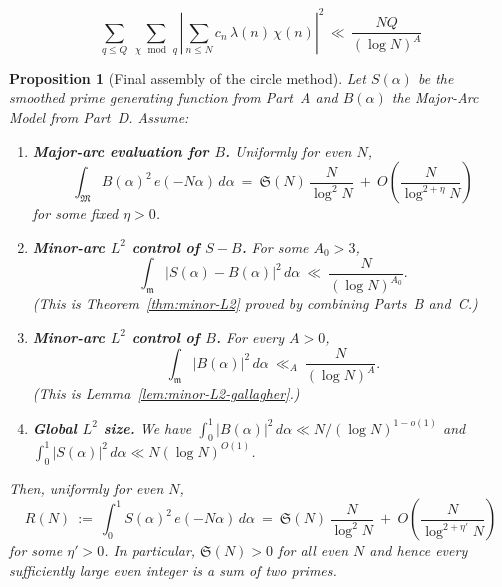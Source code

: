 \documentclass[11pt]{article}
\newtheorem{proposition}[lemma]{Proposition}
\theoremstyle{definition}
\theoremstyle{remark}
\numberwithin{equation}{part}
\begin{document}
\begin{equation}\label{eq:char-second-moment}\sum_{q\le Q}\ \sum_{\chi\,\bmod\, q}\left|\sum_{n\le N} c_n\,\lambda(n)\,\chi(n)\right|^{2}\,\ll\, \frac{NQ}{(\log N)^A}\end{equation}
\begin{proposition}[Final assembly of the circle method]
	\label{prop:reduction}
	Let $S(\alpha)$ be the smoothed prime generating function from Part~A and $B(\alpha)$ the Major-Arc Model from Part~D. Assume:

	\begin{enumerate}[label=(H\arabic*)]
		\item\label{H1} \textbf{Major-arc evaluation for $B$.} Uniformly for even $N$,
		      \[
			      \int_{\mathfrak M} B(\alpha)^2\,e(-N\alpha)\,d\alpha
			      \ =\ \mathfrak S(N)\,\frac{N}{\log^2 N}\ +\ O\!\left(\frac{N}{\log^{2+\eta}N}\right)
		      \]
		      for some fixed $\eta>0$.
		\item\label{H2} \textbf{Minor-arc $L^2$ control of $S-B$.}
		      For some $A_0>3$,
		      \[
			      \int_{\mathfrak m}\!|S(\alpha)-B(\alpha)|^2\,d\alpha\ \ll\ \frac{N}{(\log N)^{A_0}}.
		      \]
		      (This is Theorem~\ref{thm:minor-L2} proved by combining Parts~B and~C.)
		\item\label{H3} \textbf{Minor-arc $L^2$ control of $B$.} For every $A>0$,
		      \[
			      \int_{\mathfrak m}\!|B(\alpha)|^2\,d\alpha\ \ll_A\ \frac{N}{(\log N)^A}.
		      \]
		      (This is Lemma~\ref{lem:minor-L2-gallagher}.)
		\item\label{H4} \textbf{Global $L^2$ size.} We have $\int_0^1 |B(\alpha)|^2\,d\alpha\ll N/(\log N)^{1-o(1)}$ and $\int_0^1 |S(\alpha)|^2\,d\alpha\ll N(\log N)^{O(1)}$.
	\end{enumerate}
	Then, uniformly for even $N$,
	\[
		R(N)\ :=\ \int_0^1 S(\alpha)^2\,e(-N\alpha)\,d\alpha
		\ =\ \mathfrak S(N)\,\frac{N}{\log^2 N}\ +\ O\!\left(\frac{N}{\log^{2+\eta'}N}\right)
	\]
	for some $\eta'>0$. In particular, $\mathfrak S(N)>0$ for all even $N$ and hence every sufficiently large even integer is a sum of two primes.
\end{proposition}
\end{document}
